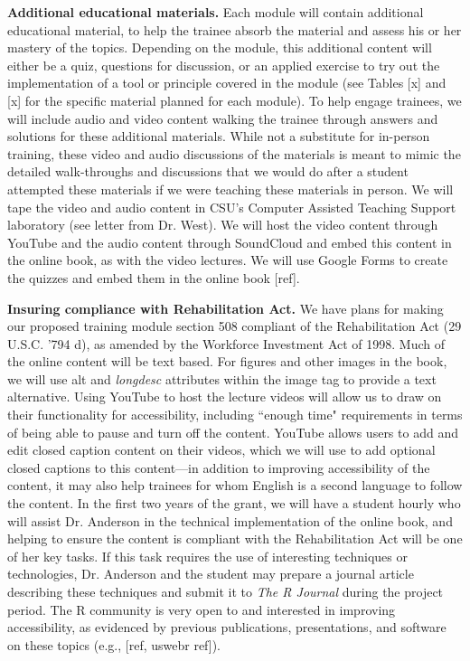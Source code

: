 \documentclass[pdftex,english,11pt,parskip=half]{scrartcl}
\begin{document}
\textbf{Additional educational materials.} Each module will contain additional educational material, to help the trainee absorb the material and assess his or her mastery of the topics. Depending on the module, this additional content will either be a quiz, questions for discussion, or an applied exercise to try out the implementation of a tool or principle covered in the module (see Tables [x] and [x] for the specific material planned for each module). To help engage trainees, we will include audio and video content walking the trainee through answers and solutions for these additional materials. While not a substitute for in-person training, these video and audio discussions of the materials is meant to mimic the detailed walk-throughs and discussions that we would do after a student attempted these materials if we were teaching these materials in person. We will tape the video and audio content in CSU's Computer Assisted Teaching Support laboratory (see letter from Dr. West). We will host the video content through YouTube and the audio content through SoundCloud and embed this content in the online book, as with the video lectures. We will use Google Forms to create the quizzes and embed them in the online book [ref].

\noindent \textbf{Insuring compliance with Rehabilitation Act.} We have plans for making our proposed training module section 508 compliant of the Rehabilitation Act (29 U.S.C. '794 d), as amended by the Workforce Investment Act of 1998. Much of the online content will be text based. For figures and other images in the book, we will use alt and \textit{longdesc} attributes within the image tag to provide a text alternative. Using YouTube to host the lecture videos will allow us to draw on their functionality for accessibility, including ``enough time" requirements in terms of being able to pause and turn off the content. YouTube allows users to add and edit closed caption content on their videos, which we will use to add optional closed captions to this content---in addition to improving accessibility of the content, it may also help trainees for whom English is a second language to follow the content. In the first two years of the grant, we will have a student hourly who will assist Dr. Anderson in the technical implementation of the online book, and helping to ensure the content is compliant with the Rehabilitation Act will be one of her key tasks. If this task requires the use of interesting techniques or technologies, Dr. Anderson and the student may prepare a journal article describing these techniques and submit it to \textit{The R Journal} during the project period. The R community is very open to and interested in improving accessibility, as evidenced by previous publications, presentations, and software on these topics (e.g., [ref, uswebr ref]).
\end{document}
